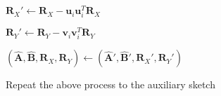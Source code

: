 \begin{algorithm}[t]
{{            $\boldsymbol{R}_X' \leftarrow \boldsymbol{R}_X - \boldsymbol{u}_i\boldsymbol{u}_i^T\boldsymbol{R}_X$

            $\boldsymbol{R}_Y' \leftarrow \boldsymbol{R}_Y - \boldsymbol{v}_i\boldsymbol{v}_i^T\boldsymbol{R}_Y$

            $(\hat{\boldsymbol{A}},\hat{\boldsymbol{B}},\boldsymbol{R}_X,\boldsymbol{R}_Y) \leftarrow (\hat{\boldsymbol{A}}{'},\hat{\boldsymbol{B}}{'},\boldsymbol{R}_X',\boldsymbol{R}_Y')$
        }
    }
    
Repeat the above process to the auxiliary sketch  
    
\end{algorithm}